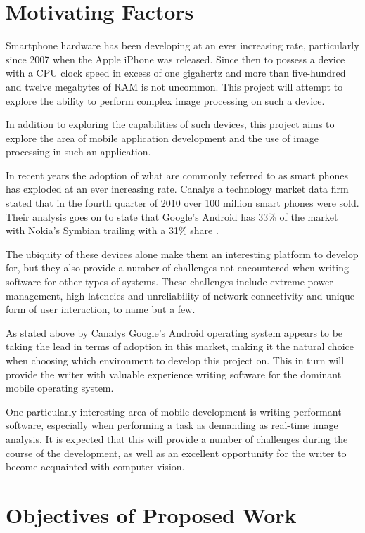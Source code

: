 \section{Motivating Factors}
Smartphone hardware has been developing at an ever increasing rate, particularly since 2007 when the Apple iPhone was released. Since then to possess a device with a CPU clock speed in excess of one gigahertz and more than five-hundred and twelve megabytes of RAM is not uncommon. This project will attempt to explore the ability to perform complex image processing on such a device.

In addition to exploring the capabilities of such devices, this project aims to explore the area of mobile application development and the use of image processing in such an application. 

In recent years the adoption of what are commonly referred to as smart phones has exploded at an ever increasing rate. Canalys a technology market data firm stated that in the fourth quarter of 2010 over 100 million smart phones were sold. Their analysis goes on to state that Google's Android has 33\% of the market with Nokia's Symbian trailing with a 31\% share \cite{canalys11}.

The ubiquity of these devices alone make them an interesting platform to develop for, but they also provide a number of challenges not encountered when writing software for other types of systems. These challenges include extreme power management, high latencies and unreliability of network connectivity and unique form of user interaction, to name but a few.

As stated above by Canalys Google's Android operating system appears to be taking the lead in terms of adoption in this market, making it the natural choice when choosing which environment to develop this project on. This in turn will provide the writer with valuable experience writing software for the dominant mobile operating system.

One particularly interesting area of mobile development is writing performant software, especially when performing a task as demanding as real-time image analysis. It is expected that this will provide a number of challenges during the course of the development, as well as an excellent opportunity for the writer to become acquainted with computer vision.


\section{Objectives of Proposed Work}

